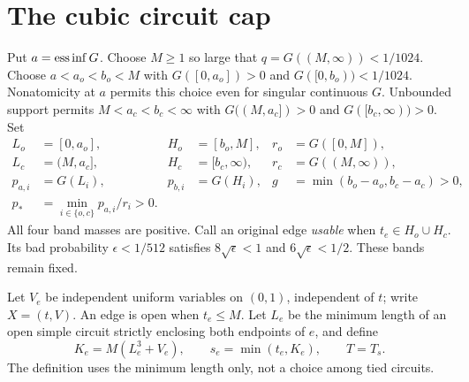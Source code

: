 \section{The cubic circuit cap}\label{sec:cap}
Put $a=\operatorname{ess\,inf} G$. Choose $M\ge1$ so large that $q=G((M,\infty))<1/1024$.
Choose $a<a_o<b_o<M$ with $G([0,a_o])>0$ and $G([0,b_o))<1/1024$.
Nonatomicity at $a$ permits this choice even for singular continuous $G$.
Unbounded support permits $M<a_c<b_c<\infty$ with
$G((M,a_c])>0$ and $G([b_c,\infty))>0$. Set
\begin{align*}
 L_o&=[0,a_o],&H_o&=[b_o,M],&r_o&=G([0,M]),\\
 L_c&=(M,a_c],&H_c&=[b_c,\infty),&r_c&=G((M,\infty)),\\
 p_{a,i}&=G(L_i),&p_{b,i}&=G(H_i),&
 g&=\min(b_o-a_o,b_c-a_c)>0,\\
 p_*&=\min_{i\in\{o,c\}}p_{a,i}/r_i>0.
\end{align*}
All four band masses are positive. Call an original edge \emph{usable} when
$t_e\in H_o\cup H_c$. Its bad probability $\epsilon<1/512$ satisfies
$8\sqrt\epsilon<1$ and $6\sqrt\epsilon<1/2$. These bands remain fixed.

Let $V_e$ be independent uniform variables on $(0,1)$, independent of $t$;
write $X=(t,V)$. An edge is open when $t_e\le M$. Let $L_e$ be the minimum
length of an open simple circuit strictly enclosing both endpoints of $e$,
and define
\begin{equation}\label{eq:cap}
 K_e=M(L_e^3+V_e),\qquad s_e=\min(t_e,K_e),\qquad T=T_s.
\end{equation}
The definition uses the minimum length only, not a choice among tied circuits.

